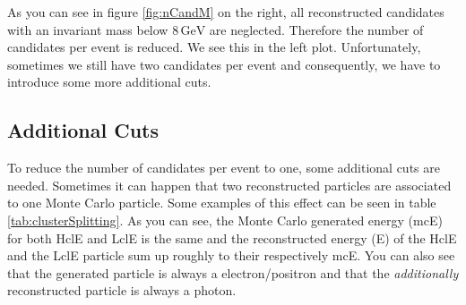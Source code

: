 \documentclass[a4paper,11pt,twosided,final,german,openbib,pdftex,listof=totoc,bibliography=totoc]{scrbook}
\begin{document}
As you can see in figure \ref{fig:nCandM} on the right, all reconstructed candidates with an invariant mass below $8\,\textrm{GeV}$ are neglected. Therefore the number of candidates per event is reduced. We see this in the left plot. Unfortunately, sometimes we still have two candidates per event and consequently, we have to introduce some more additional cuts.



\subsection{Additional Cuts}

To reduce the number of candidates per event to one, some additional cuts are needed. Sometimes it can happen that two reconstructed particles are associated to one Monte Carlo particle. Some examples of this effect can be seen in table \ref{tab:clusterSplitting}. As you can see, the Monte Carlo generated energy (mcE) for both HclE and LclE is the same and the reconstructed energy (E) of the HclE and the LclE particle sum up roughly to their respectively mcE. You can also see that the generated particle is always a electron/positron and that the \textit{additionally} reconstructed particle is always a photon.





\begin{table}[h!]
	\centering
\caption[Cluster Splitting Examples]{Some examples for events with cluster splitting. The energies are in GeV.}
\label{tab:clusterSplitting}
\end{table}
\end{document}
